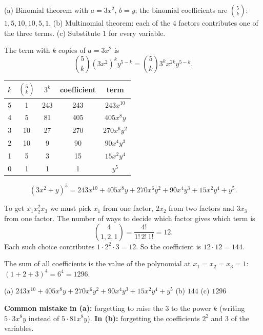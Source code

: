 \begin{solution}
	\idea (a) Binomial theorem with $a=3x^2$, $b=y$; the binomial coefficients
	are $\binom5k$: $1,5,10,10,5,1$. (b) Multinomial theorem: each of the 4
	factors contributes one of the three terms. (c) Substitute $1$ for every
	variable.

	 The term with $k$ copies of $a=3x^2$ is
	\[ \binom5k(3x^2)^ky^{5-k}=\binom5k3^kx^{2k}y^{5-k}. \]
	\begin{center}
		\begin{tabular}{ccccc}
			\toprule $k$ & $\binom5k$ & $3^k$ & coefficient & term        \\\midrule
			5            & 1          & 243   & 243         & $243x^{10}$ \\
			4            & 5          & 81    & 405         & $405x^8y$   \\
			3            & 10         & 27    & 270         & $270x^6y^2$ \\
			2            & 10         & 9     & 90          & $90x^4y^3$  \\
			1            & 5          & 3     & 15          & $15x^2y^4$  \\
			0            & 1          & 1     & 1           & $y^5$       \\\bottomrule
		\end{tabular}
	\end{center}
	\[ (3x^2+y)^5=243x^{10}+405x^8y+270x^6y^2+90x^4y^3+15x^2y^4+y^5. \]

	 To get $x_1x_2^2x_3$ we must pick $x_1$ from one factor, $2x_2$
	from two factors and $3x_3$ from one factor. The number of ways to decide
	which factor gives which term is
	\[ \binom{4}{1,2,1}=\frac{4!}{1!\,2!\,1!}=12. \]
	Each such choice contributes $1\cdot2^2\cdot3=12$. So the coefficient is
	$12\cdot12=144$.

	 The sum of all coefficients is the value of the polynomial at
	$x_1=x_2=x_3=1$: $(1+2+3)^4=6^4=1296$.
	\begin{answer}
		(a) $243x^{10}+405x^8y+270x^6y^2+90x^4y^3+15x^2y^4+y^5$ \quad
		(b) $144$ \quad (c) $1296$
	\end{answer}
	\begin{remark}
		\textbf{Common mistake in (a):} forgetting to raise the $3$ to the power
		$k$ (writing $5\cdot3x^8y$ instead of $5\cdot81x^8y$). \textbf{In (b):}
		forgetting the coefficients $2^2$ and $3$ of the variables.
	\end{remark}
\end{solution}
